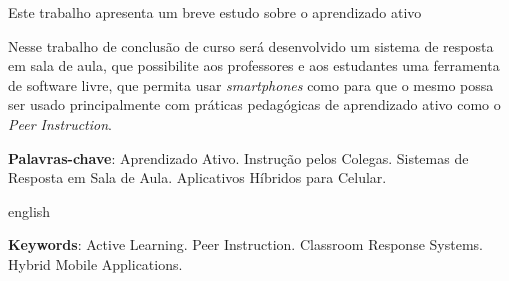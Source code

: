 \setlength{\absparsep}{18pt} %
\begin{resumo}
  Este trabalho apresenta um breve estudo sobre o aprendizado ativo

  Nesse trabalho de conclusão de curso será desenvolvido um sistema de resposta em sala de aula,
  que possibilite aos professores e aos estudantes uma ferramenta de software livre,
  que permita usar {\textit{smartphones}} como {\clickers} para que o mesmo possa
  ser usado principalmente com práticas pedagógicas de aprendizado ativo como o \textit{Peer Instruction}.

 \textbf{Palavras-chave}:  Aprendizado Ativo. Instrução pelos Colegas. Sistemas de Resposta em Sala de Aula. Aplicativos Híbridos para Celular.
\end{resumo}

\begin{resumo}[Abstract]
 \begin{otherlanguage*}{english}


   \vspace{\onelineskip}

   \noindent
   \textbf{Keywords}: Active Learning. Peer Instruction. Classroom Response Systems. Hybrid Mobile Applications.
 \end{otherlanguage*}
\end{resumo}
